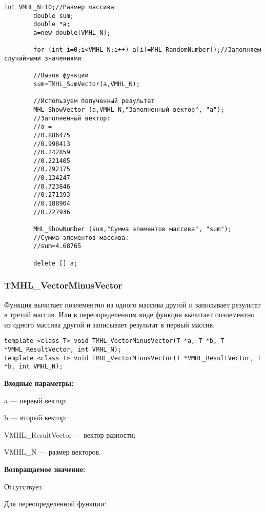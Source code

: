 \documentclass[a4paper,12pt]{article}
\begin{document}
\begin{lstlisting}[label=code_use_TMHL_SumVector,caption=Пример использования]
        int VMHL_N=10;//Размер массива
        double sum;
        double *a;
        a=new double[VMHL_N];

        for (int i=0;i<VMHL_N;i++) a[i]=MHL_RandomNumber();//Заполняем случайными значениями

        //Вызов функции
        sum=TMHL_SumVector(a,VMHL_N);

        //Используем полученный результат
        MHL_ShowVector (a,VMHL_N,"Заполненный вектор", "a");
        //Заполненный вектор:
        //a =
        //0.886475
        //0.998413
        //0.242859
        //0.221405
        //0.292175
        //0.134247
        //0.723846
        //0.271393
        //0.188904
        //0.727936

        MHL_ShowNumber (sum,"Сумма элементов массива", "sum");
        //Сумма элементов массива:
        //sum=4.68765

        delete [] a;
\end{lstlisting}

\subsubsection{TMHL\_VectorMinusVector}\label{TMHL_VectorMinusVector}

Функция вычитает поэлементно из одного массива другой и записывает результат в третий массив. Или в переопределенном виде функция вычитает поэлементно из одного массива другой и записывает результат в первый массив.


\begin{lstlisting}[label=code_syntax_TMHL_VectorMinusVector,caption=Синтаксис]
template <class T> void TMHL_VectorMinusVector(T *a, T *b, T *VMHL_ResultVector, int VMHL_N);
template <class T> void TMHL_VectorMinusVector(T *VMHL_ResultVector, T *b, int VMHL_N);
\end{lstlisting}

\textbf{Входные параметры:}

  a --- первый вектор;
  
 b --- вторый вектор;
 
 VMHL\_ResultVector --- вектор разности;
 
 VMHL\_N --- размер векторов.

\textbf{Возвращаемое значение:}

Отсутствует.

Для переопределенной функции:
\end{document}
